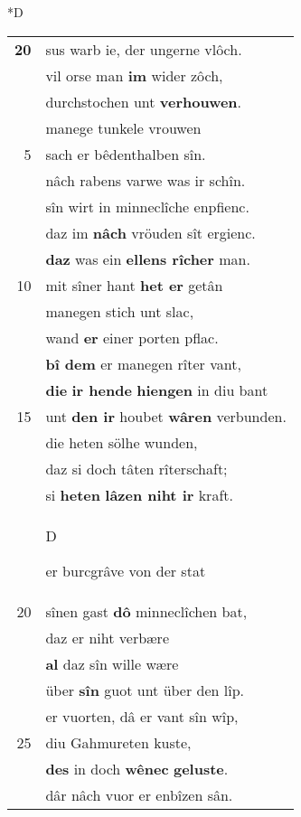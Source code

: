 \documentclass[8pt,a4paper,notitlepage]{article}
\begin{document}
\begin{table}[ht]
\begin{minipage}[t]{0.5\linewidth}
\small
\begin{center}*D
\end{center}
\begin{tabular}{rl}
\textbf{20} & sus warb ie, der ungerne vlôch.\\ 
 & vil orse man \textbf{im} wider zôch,\\ 
 & durchstochen unt \textbf{verhouwen}.\\ 
 & manege tunkele vrouwen\\ 
5 & sach er bêdenthalben sîn.\\ 
 & nâch rabens varwe was ir schîn.\\ 
 & sîn wirt in minneclîche enpfienc.\\ 
 & daz im \textbf{nâch} vröuden sît ergienc.\\ 
 & \textbf{daz} was ein \textbf{ellens rîcher} man.\\ 
10 & mit sîner hant \textbf{het er} getân\\ 
 & manegen stich unt slac,\\ 
 & wand \textbf{er} einer porten pflac.\\ 
 & \textbf{bî dem} er manegen rîter vant,\\ 
 & \textbf{die} \textbf{ir hende} \textbf{hiengen} in diu bant\\ 
15 & unt \textbf{den ir} houbet \textbf{wâren} verbunden.\\ 
 & die heten sölhe wunden,\\ 
 & daz si doch tâten rîterschaft;\\ 
 & si \textbf{heten} \textbf{lâzen niht ir} kraft.\\ 
 & \begin{large}D\end{large}er burcgrâve von der stat\\ 
20 & sînen gast \textbf{dô} minneclîchen bat,\\ 
 & daz er niht verbære\\ 
 & \textbf{al} daz sîn wille wære\\ 
 & über \textbf{sîn} guot unt über den lîp.\\ 
 & er vuorten, dâ er vant sîn wîp,\\ 
25 & diu Gahmureten kuste,\\ 
 & \textbf{des} in doch \textbf{wênec} \textbf{geluste}.\\ 
 & dâr nâch vuor er enbîzen sân.\\ 

\end{tabular}
\end{minipage}
\end{table}
\end{document}
